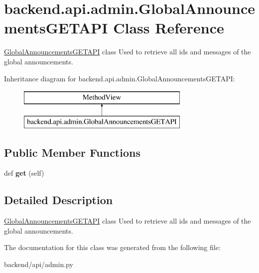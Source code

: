 \hypertarget{classbackend_1_1api_1_1admin_1_1_global_announcements_g_e_t_a_p_i}{}\section{backend.\+api.\+admin.\+Global\+Announcements\+G\+E\+T\+A\+P\+I Class Reference}
\label{classbackend_1_1api_1_1admin_1_1_global_announcements_g_e_t_a_p_i}


\hyperlink{classbackend_1_1api_1_1admin_1_1_global_announcements_g_e_t_a_p_i}{Global\+Announcements\+G\+E\+T\+A\+P\+I} class Used to retrieve all ids and messages of the global announcements.  


Inheritance diagram for backend.\+api.\+admin.\+Global\+Announcements\+G\+E\+T\+A\+P\+I\+:\begin{figure}[H]
\begin{center}
\leavevmode
\includegraphics[height=2.000000cm]{classbackend_1_1api_1_1admin_1_1_global_announcements_g_e_t_a_p_i}
\end{center}
\end{figure}
\subsection*{Public Member Functions}
\begin{DoxyCompactItemize}
\item 
\hypertarget{classbackend_1_1api_1_1admin_1_1_global_announcements_g_e_t_a_p_i_a9699035dd9cbd59b3bb0a8a9037c522d}{}def {\bfseries get} (self)\label{classbackend_1_1api_1_1admin_1_1_global_announcements_g_e_t_a_p_i_a9699035dd9cbd59b3bb0a8a9037c522d}

\end{DoxyCompactItemize}


\subsection{Detailed Description}
\hyperlink{classbackend_1_1api_1_1admin_1_1_global_announcements_g_e_t_a_p_i}{Global\+Announcements\+G\+E\+T\+A\+P\+I} class Used to retrieve all ids and messages of the global announcements. 

The documentation for this class was generated from the following file\+:\begin{DoxyCompactItemize}
\item 
backend/api/admin.\+py\end{DoxyCompactItemize}
